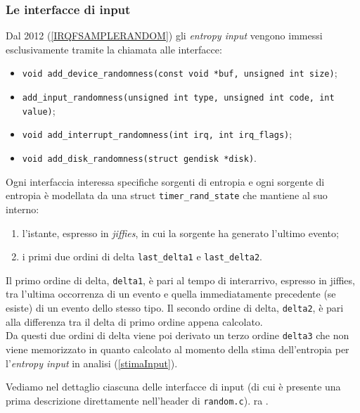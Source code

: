 \documentclass{article}
\begin{document}
 \subsubsection{Le interfacce di input}\label{interfacceinput}
 Dal 2012 (\ref{IRQFSAMPLERANDOM}) gli \emph{entropy input} vengono immessi
 esclusivamente tramite la chiamata alle interfacce:
 \begin{itemize}
   \item \verb+void add_device_randomness(const void *buf, unsigned int size)+;
   \item \verb+add_input_randomness(unsigned int type, unsigned int code, int value)+;
   \item \verb+void add_interrupt_randomness(int irq, int irq_flags)+;
   \item \verb+void add_disk_randomness(struct gendisk *disk)+.
 \end{itemize}
 
 Ogni interfaccia interessa specifiche sorgenti di entropia e ogni sorgente di
 entropia è modellata da una struct \verb+timer_rand_state+ che mantiene al suo interno:
 \begin{enumerate}
   \item l'istante, espresso in \emph{jiffies}, in cui la
   sorgente ha generato l'ultimo evento;
   \item i primi due ordini di delta \verb+last_delta1+ e \verb+last_delta2+.
 \end{enumerate} 
 
 Il primo ordine di delta, \verb+delta1+, è pari al tempo di interarrivo,
 espresso in jiffies, tra l'ultima occorrenza di un evento e quella
 immediatamente precedente (se esiste) di un evento dello stesso tipo.\newline{}
 Il secondo ordine di delta, \verb+delta2+, è pari alla differenza tra il delta
 di primo ordine appena calcolato.\\
 Da questi due ordini di delta viene poi derivato un terzo ordine \verb+delta3+
 che non viene memorizzato in quanto calcolato al momento della stima
 dell'entropia per l'\emph{entropy input} in analisi (\ref{stimaInput}).
 
 Vediamo nel dettaglio ciascuna delle interfacce di input (di cui è presente una 
 prima descrizione direttamente nell'header di \verb+random.c+).
 ra \cite{mack}.\\ 
 
 
\end{document}
